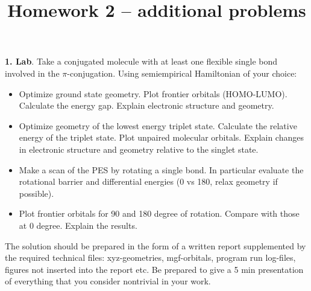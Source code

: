 \documentclass{homework}
\begin{document}
\title{Homework 2 -- additional problems}
\maketitle

\textbf{1. Lab}. Take a conjugated molecule with at least one flexible single bond involved in the $\pi$-conjugation. Using semiempirical Hamiltonian of your choice:
\begin{itemize}\setlength{\itemsep}{0ex}
\item Optimize ground state geometry. Plot frontier orbitals (HOMO-LUMO). Calculate the energy gap. Explain electronic structure and geometry.
\item Optimize geometry of the lowest energy triplet state. Calculate the relative energy of the triplet state. Plot unpaired molecular orbitals. Explain changes in electronic structure and geometry relative to the singlet state.
\item Make a scan of the PES by rotating a single bond. In particular evaluate the rotational barrier and differential energies (0 vs 180, relax geometry if possible).
\item Plot frontier orbitals for 90 and 180 degree of rotation. Compare with those at 0 degree. Explain the results.
\end{itemize}
The solution should be prepared in the form of a written report supplemented by the required technical files: xyz-geometries, mgf-orbitals, program run log-files, figures not inserted into the report etc. Be prepared to give a 5 min presentation of everything that you consider nontrivial in your work.
\end{document}
